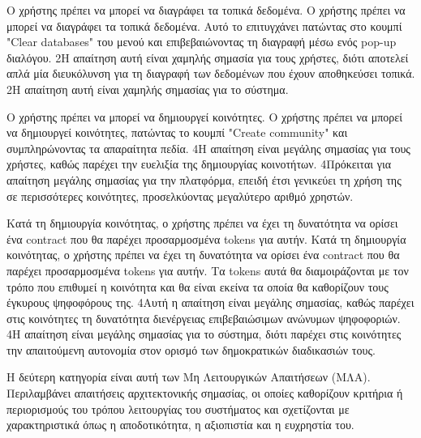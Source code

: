 \begin{enumerate}[label=\textbf{<ΛΑ-\arabic*>}, leftmargin=\parindent, align=left, labelwidth=\parindent, labelsep=0pt]
	\sysReqItem
		{\label{srs:functional-srs-delete-local-data}}
		{Ο χρήστης πρέπει να μπορεί να διαγράφει τα τοπικά δεδομένα.}
		{Ο χρήστης πρέπει να μπορεί να διαγράφει τα τοπικά δεδομένα. Αυτό το επιτυγχάνει πατώντας στο κουμπί "Clear databases" του μενού και επιβεβαιώνοντας τη διαγραφή μέσω ενός pop-up διαλόγου.}
		{2}{Η απαίτηση αυτή είναι χαμηλής σημασία για τους χρήστες, διότι αποτελεί απλά μία διευκόλυνση για τη διαγραφή των δεδομένων που έχουν αποθηκεύσει τοπικά.}
		{2}{Η απαίτηση αυτή είναι χαμηλής σημασίας για το σύστημα.}

	\sysReqItem
		{\label{srs:functional-srs-create-communities}}
		{Ο χρήστης πρέπει να μπορεί να δημιουργεί κοινότητες.}
		{Ο χρήστης πρέπει να μπορεί να δημιουργεί κοινότητες, πατώντας το κουμπί "Create community" και συμπληρώνοντας τα απαραίτητα πεδία.}
		{4}{Η απαίτηση είναι μεγάλης σημασίας για τους χρήστες, καθώς παρέχει την ευελιξία της δημιουργίας κοινοτήτων.}
		{4}{Πρόκειται για απαίτηση μεγάλης σημασίας για την πλατφόρμα, επειδή έτσι γενικεύει τη χρήση της σε περισσότερες κοινότητες, προσελκύοντας μεγαλύτερο αριθμό χρηστών.}

	\sysReqItem
		{\label{srs:functional-srs-assign-community-contract}}
		{Κατά τη δημιουργία κοινότητας, ο χρήστης πρέπει να έχει τη δυνατότητα να ορίσει ένα contract που θα παρέχει προσαρμοσμένα tokens για αυτήν.}
		{Κατά τη δημιουργία κοινότητας, ο χρήστης πρέπει να έχει τη δυνατότητα να ορίσει ένα contract που θα παρέχει προσαρμοσμένα tokens για αυτήν. Τα tokens αυτά θα διαμοιράζονται με τον τρόπο που επιθυμεί η κοινότητα και θα είναι εκείνα τα οποία θα καθορίζουν τους έγκυρους ψηφοφόρους της.}
		{4}{Αυτή η απαίτηση είναι μεγάλης σημασίας, καθώς παρέχει στις κοινότητες τη δυνατότητα διενέργειας επιβεβαιώσιμων ανώνυμων ψηφοφοριών.}
		{4}{Η απαίτηση είναι μεγάλης σημασίας για το σύστημα, διότι παρέχει στις κοινότητες την απαιτούμενη αυτονομία στον ορισμό των δημοκρατικών διαδικασιών τους.}
\end{enumerate}

Η δεύτερη κατηγορία είναι αυτή των Μη Λειτουργικών Απαιτήσεων (ΜΛΑ). Περιλαμβάνει απαιτήσεις αρχιτεκτονικής σημασίας, οι οποίες καθορίζουν κριτήρια ή περιορισμούς του τρόπου λειτουργίας του συστήματος και σχετίζονται με χαρακτηριστικά όπως η αποδοτικότητα, η αξιοπιστία και η ευχρηστία του.

